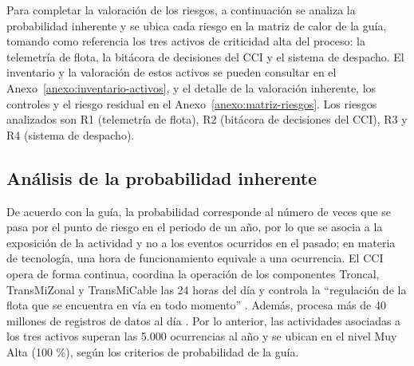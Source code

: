 
Para completar la valoración de los riesgos, a continuación se analiza la probabilidad inherente y se ubica cada riesgo en la matriz de calor de la guía, tomando como referencia los tres activos de criticidad alta del proceso: la telemetría de flota, la bitácora de decisiones del CCI y el sistema de despacho. El inventario y la valoración de estos activos se pueden consultar en el Anexo~\ref{anexo:inventario-activos}, y el detalle de la valoración inherente, los controles y el riesgo residual en el Anexo~\ref{anexo:matriz-riesgos}. Los riesgos analizados son R1 (telemetría de flota), R2 (bitácora de decisiones del CCI), R3 y R4 (sistema de despacho).

\subsection{Análisis de la probabilidad inherente}

De acuerdo con la guía, la probabilidad corresponde al número de veces que se pasa por el punto de riesgo en el periodo de un año, por lo que se asocia a la exposición de la actividad y no a los eventos ocurridos en el pasado; en materia de tecnología, una hora de funcionamiento equivale a una ocurrencia. El CCI opera de forma continua, coordina la operación de los componentes Troncal, TransMiZonal y TransMiCable las 24 horas del día y controla la \enquote{regulación de la flota que se encuentra en vía en todo momento} \parencite{transmilenio2020peti}. Además, procesa más de 40 millones de registros de datos al día \parencite{transmilenio2026cci}. Por lo anterior, las actividades asociadas a los tres activos superan las 5.000 ocurrencias al año y se ubican en el nivel Muy Alta (100 \%), según los criterios de probabilidad de la guía.

